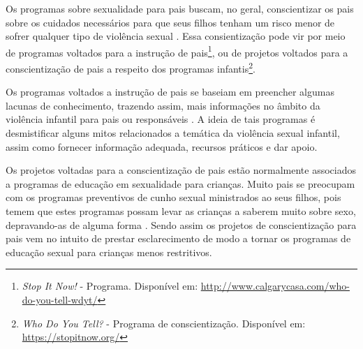 
Os programas sobre sexualidade para pais buscam, no geral, conscientizar os pais sobre os cuidados necessários para que seus filhos tenham um risco menor de sofrer qualquer tipo de violência sexual \cite{pelisoli2010prevenccao}. Essa consientização pode vir por meio de programas voltados para a instrução de pais\footnote{\textit{\label{note:nota2}Stop It Now!} - Programa. Disponível em: \url{http://www.calgarycasa.com/who-do-you-tell-wdyt/}}, ou de projetos voltados para a conscientização de pais a respeito dos programas infantis\footnote{\textit{\label{note:nota3}Who Do You Tell?} - Programa de conscientização. Disponível em: \url{https://stopitnow.org/}}. 

Os programas voltados a instrução de pais se baseiam em preencher algumas lacunas de conhecimento, trazendo assim, mais informações no âmbito da violência infantil para pais ou responsáveis \cite{maria2010papel}. A ideia de tais programas é desmistificar alguns mitos relacionados a temática da violência sexual infantil, assim como fornecer informação adequada, recursos práticos e dar apoio.

Os projetos voltadas para a conscientização de pais estão normalmente associados a programas de educação em sexualidade para crianças. Muito pais se preocupam com os programas preventivos de cunho sexual ministrados ao seus filhos, pois temem que estes programas possam levar as crianças a saberem muito sobre sexo, depravando-as de alguma forma \cite{chen2007prevention}. Sendo assim os projetos de conscientização para pais vem no intuito de prestar esclarecimento de modo a tornar os programas de educação sexual para crianças menos restritivos. 



